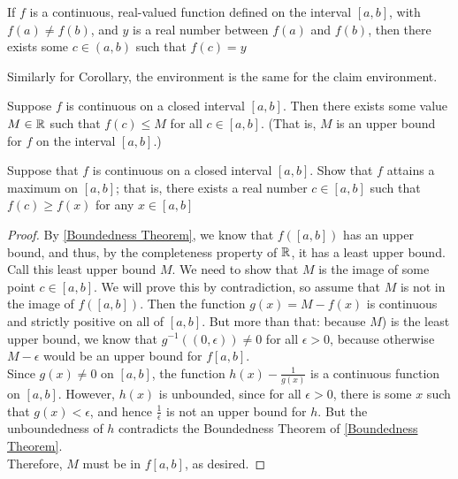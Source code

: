 \begin{theorem}\label{IVT}
	If \(f\) is a continuous, real-valued function defined on the interval \([a,b]\), with \(f(a)\ne f(b)\), and \(y\) is a real number between \(f(a)\) and \(f(b)\), then there exists some \(c\in(a,b)\) such that \(f(c)=y\)
\end{theorem}

Similarly for Corollary, the environment is the same for the claim environment.

\begin{corollary}\label{Boundedness Theorem}
	Suppose \(f\) is continuous on a closed interval \([a,b]\). Then there exists some value \(M\in\mathbb{R}\) such that \(f(c)\leq M\) for all \(c\in[a,b]\). (That is, \(M\) is an upper bound for \(f\) on the interval \([a,b]\).)
\end{corollary}

\begin{example}\label{extreme Value Theorem}
	
	Suppose that \(f\) is continuous on a closed interval \([a,b]\). Show that \(f\) attains a maximum on \([a,b]\); that is, there exists a real number \(c\in[a,b]\) such that \(f(c)\geq f(x)\) for any \(x\in[a,b]\)
\end{example}

\begin{proof}
	By \cref{Boundedness Theorem}, we know that \(f([a,b])\) has an upper bound, and thus, by the completeness property of \(\mathbb{R}\), it has a least upper bound. Call this least upper bound \(M\). We need to show that \(M\) is the image of some point \(c\in[a,b]\). We will prove this by contradiction, so assume that \(M\) is not in the image of \(f([a,b])\). Then the function \(g(x)=M-f(x)\) is continuous and strictly positive on all of \([a,b]\). But more than that: because \(M\)) is the least upper bound, we know that \(g^{-1}((0,\epsilon))\ne 0\) for all \(\epsilon>0\), because otherwise \(M-\epsilon\) would be an upper bound for \(f[a,b]\).\\

	Since \(g(x)\ne 0\) on \([a,b]\), the function \(h(x)-\frac{1}{g(x)}\) is a continuous function on \([a,b]\). However, \(h(x)\) is unbounded, since for all \(\epsilon>0\), there is some \(x\) such that \(g(x)<\epsilon\), and hence \(\frac{1}{\epsilon}\) is not an upper bound for \(h\). But the unboundedness of \(h\) contradicts the Boundedness Theorem of \cref{Boundedness Theorem}.\\

	Therefore, \(M\) must be in \(f[a,b]\), as desired.
\end{proof}

